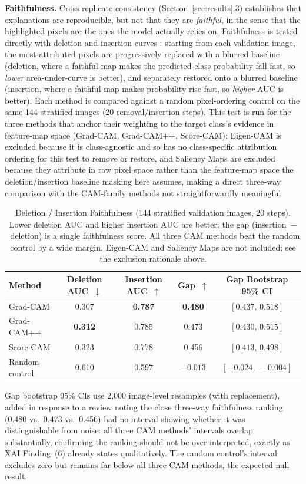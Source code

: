 \textbf{Faithfulness.} Cross-replicate consistency (Section~\ref{sec:results}.3) establishes that explanations are reproducible, but not that they are \textit{faithful}, in the sense that the highlighted pixels are the ones the model actually relies on. Faithfulness is tested directly with deletion and insertion curves \cite{ref14}: starting from each validation image, the most-attributed pixels are progressively replaced with a blurred baseline (deletion, where a faithful map makes the predicted-class probability fall fast, so \textit{lower} area-under-curve is better), and separately restored onto a blurred baseline (insertion, where a faithful map makes probability rise fast, so \textit{higher} AUC is better). Each method is compared against a random pixel-ordering control on the same 144 stratified images (20 removal/insertion steps). This test is run for the three methods that anchor their weighting to the target class's evidence in feature-map space (Grad-CAM, Grad-CAM++, Score-CAM); Eigen-CAM is excluded because it is class-agnostic and so has no class-specific attribution ordering for this test to remove or restore, and Saliency Maps are excluded because they attribute in raw pixel space rather than the feature-map space the deletion/insertion baseline masking here assumes, making a direct three-way comparison with the CAM-family methods not straightforwardly meaningful.

\begin{table}[!ht]
\centering
\caption{Deletion / Insertion Faithfulness (144 stratified validation images, 20 steps). Lower deletion AUC and higher insertion AUC are better; the gap (insertion~$-$~deletion) is a single faithfulness score. All three CAM methods beat the random control by a wide margin. Eigen-CAM and Saliency Maps are not included; see the exclusion rationale above.}
\label{tbl:7}
\begin{tabular}{lcccc}
\toprule
Method & Deletion AUC~$\downarrow$ & Insertion AUC~$\uparrow$ & Gap~$\uparrow$ & Gap Bootstrap 95\% CI \\
\midrule
Grad-CAM & 0.307 & \textbf{0.787} & \textbf{0.480} & $[0.437,\,0.518]$ \\
Grad-CAM++ & \textbf{0.312} & 0.785 & 0.473 & $[0.430,\,0.515]$ \\
Score-CAM & 0.323 & 0.778 & 0.456 & $[0.413,\,0.498]$ \\
Random control & 0.610 & 0.597 & $-0.013$ & $[-0.024,\,-0.004]$ \\
\bottomrule
\end{tabular}

\vspace{2pt}
\raggedright\footnotesize Gap bootstrap 95\% CIs use 2,000 image-level resamples (with replacement), added in response to a review noting the close three-way faithfulness ranking (0.480 vs.\ 0.473 vs.\ 0.456) had no interval showing whether it was distinguishable from noise: all three CAM methods' intervals overlap substantially, confirming the ranking should not be over-interpreted, exactly as XAI Finding~(6) already states qualitatively. The random control's interval excludes zero but remains far below all three CAM methods, the expected null result.
\end{table}

